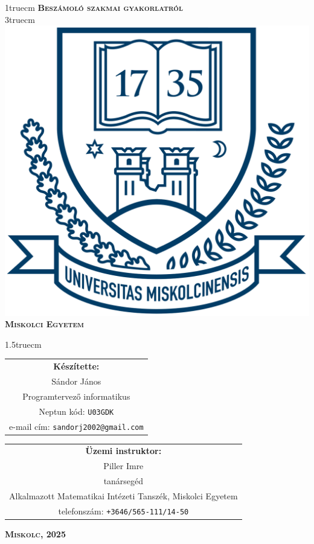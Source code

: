 \pagestyle{empty} %

{\large
\begin{center}
\vglue 1truecm
\textbf{\huge\textsc{Beszámoló szakmai gyakorlatról}}\\
\vglue 3truecm
\includegraphics[width=4.8truecm, height=4truecm]{images/me_logo.png}\\
\textbf{\textsc{Miskolci Egyetem}}
\end{center}}

\vglue 1.5truecm %

{\large
\begin{center}
\begin{tabular}{c}
\textbf{Készítette:}\\
Sándor János \\
Programtervező informatikus \\
Neptun kód: \texttt{U03GDK} \\
e-mail cím: \texttt{sandorj2002@gmail.com}
\end{tabular}
\end{center}
\vskip 1cm
\begin{center}
\begin{tabular}{c}
\textbf{Üzemi instruktor:}\\
Piller Imre \\
tanársegéd \\
Alkalmazott Matematikai Intézeti Tanszék, Miskolci Egyetem \\
telefonszám: \texttt{+3646/565-111/14-50}


\end{tabular}
\end{center}}
\vfill
{\large
\begin{center}
\textbf{\textsc{Miskolc, 2025}}
\end{center}}

\newpage
